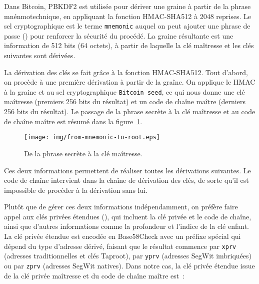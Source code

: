 Dans Bitcoin, PBKDF2 est utilisée pour dériver une graine à partir de la phrase mnénmotechnique, en appliquant la fonction HMAC-SHA512 à 2048 reprises. Le sel cryptographique est le terme \texttt{mnemonic} auquel on peut ajouter une phrase de passe () pour renforcer la sécurité du procédé. La graine résultante est une information de 512 bits (64 octets), à partir de laquelle la clé maîtresse et les clés suivantes sont dérivées.


La dérivation des clés se fait grâce à la fonction HMAC-SHA512. Tout d'abord, on procède à une première dérivation à partir de la graîne. On applique le HMAC à la graine et au sel cryptographique \texttt{Bitcoin seed}, ce qui nous donne une clé maîtresse (premiers 256 bits du résultat) et un code de chaîne maître (derniers 256 bits du résultat). Le passage de la phrase secrète à la clé maîtresse et au code de chaîne maître est résumé dans la figure~\ref{fig:from-mnemonic-to-root}.

\begin{figure}[h]
  \centering
  \texttt{[image: img/from-mnemonic-to-root.eps]}
  \caption{De la phrase secrète à la clé maîtresse.}
  \label{fig:from-mnemonic-to-root}
\end{figure}


Ces deux informations permettent de réaliser toutes les dérivations suivantes. Le code de chaîne intervient dans la chaîne de dérivation des clés, de sorte qu'il est impossible de procéder à la dérivation sans lui.

Plutôt que de gérer ces deux informations indépendamment, on préfère faire appel aux clés privées étendues (), qui incluent la clé privée et le code de chaîne, ainsi que d'autres informations comme la profondeur et l'indice de la clé enfant. La clé privée étendue est encodée en Base58Check avec un préfixe spécial qui dépend du type d'adresse dérivé, faisant que le résultat commence par \texttt{xprv} (adresses traditionnelles et clés Taproot), par \texttt{yprv} (adresses SegWit imbriquées) ou par \texttt{zprv} (adresses SegWit natives). Dans notre cas, la clé privée étendue issue de la clé privée maîtresse et du code de chaîne maître est~:

